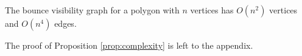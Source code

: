 \documentclass[]{styles/svproc}  %
\begin{document}
\begin{proposition} \label{prop:complexity}
The bounce visibility graph for a polygon with $n$ vertices has 
$O(n^2)$ vertices and $O(n^4)$ edges.
\end{proposition}

The proof of Proposition \ref{prop:complexity} is left to the appendix. 

%
%
\end{document}
